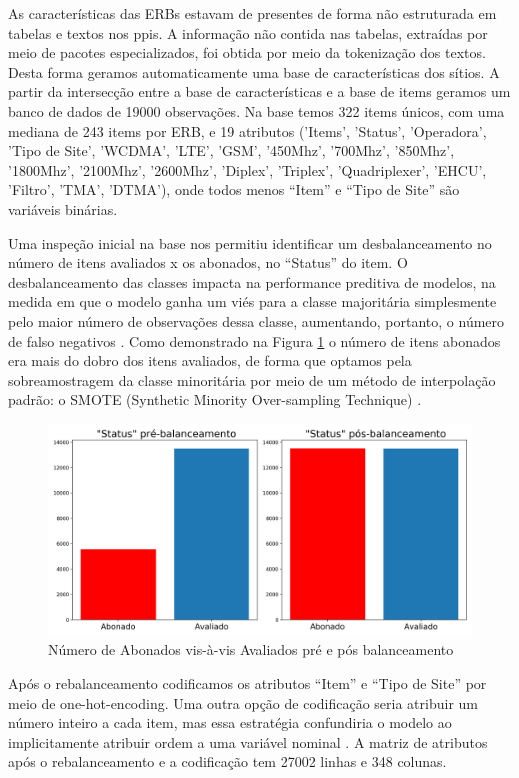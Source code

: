 \documentclass[
	12pt,				%
	openany,			%
	oneside,			%
	a4paper,			%
	english,			%
	french,				%
	spanish,			%
	brazil,				%
	]{abntex2}
\begin{document}
As características das ERBs estavam de presentes de forma não estruturada em
tabelas e textos nos ppis. A informação não contida nas tabelas, extraídas por
meio de pacotes especializados, foi obtida por meio da tokenização dos textos.
Desta forma geramos automaticamente uma base de características dos sítios. A
partir da intersecção entre a base de características e a base de items geramos
um banco de dados de 19000 observações. Na base temos 322 items únicos, com uma
mediana de 243 items por ERB, e 19 atributos ('Items', 'Status', 'Operadora',
'Tipo de Site', 'WCDMA', 'LTE', 'GSM', '450Mhz', '700Mhz', '850Mhz', '1800Mhz',
'2100Mhz', '2600Mhz', 'Diplex', 'Triplex', 'Quadriplexer', 'EHCU', 'Filtro',
'TMA', 'DTMA'), onde todos menos ``Item'' e ``Tipo de Site'' são variáveis
binárias.

Uma inspeção inicial na base nos permitiu identificar um desbalanceamento no
número de itens avaliados x os abonados, no ``Status'' do item. O
desbalanceamento das classes impacta na performance preditiva de modelos, na
medida em que o modelo ganha um viés para a classe majoritária simplesmente pelo
maior número de observações dessa classe, aumentando, portanto, o número de
falso negativos \cite{faceli2011inteligencia}. Como demonstrado na Figura
\ref{ref:figbal} o número de itens abonados era mais do dobro dos itens
avaliados, de forma que optamos pela sobreamostragem da classe minoritária por
meio de um método de interpolação padrão: o SMOTE (Synthetic Minority
Over-sampling Technique) \cite{chawla2002smote}. 

\begin{figure}[h]
  \includegraphics[scale=0.5]{img/balanceamento.png}
  \caption{Número de Abonados vis-à-vis Avaliados pré e pós balanceamento}
  \label{ref:figbal}
\end{figure}

Após o rebalanceamento codificamos os atributos ``Item'' e ``Tipo de Site'' por
meio de one-hot-encoding. Uma outra opção de codificação seria atribuir um
número inteiro a cada item, mas essa estratégia confundiria o modelo ao
implicitamente atribuir ordem a uma variável nominal
\cite{faceli2011inteligencia}. A matriz de atributos após o rebalanceamento e a
codifica\c{c}ão tem 27002 linhas e 348 colunas.
\end{document}
